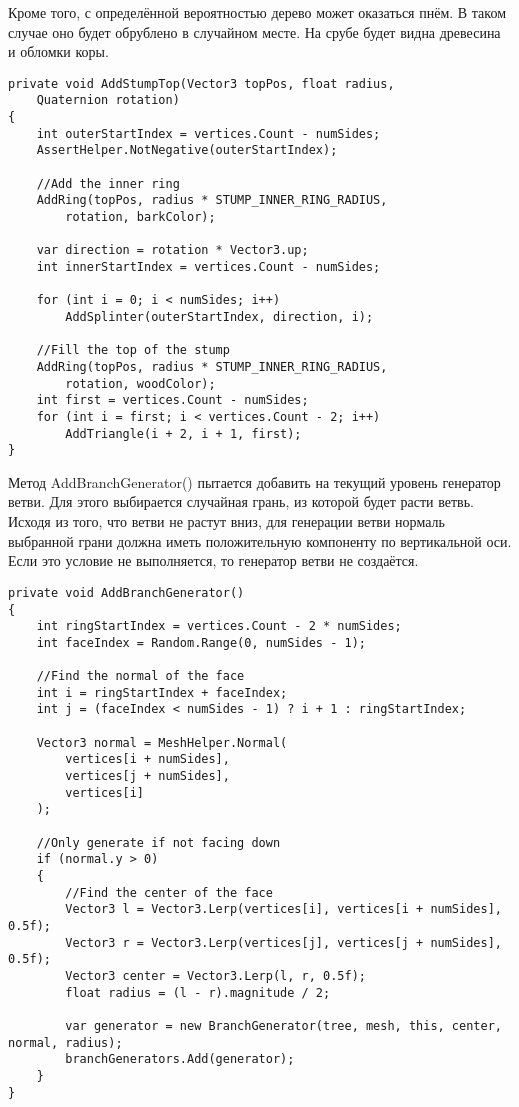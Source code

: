 Кроме того, с определённой вероятностью дерево может оказаться пнём. В таком случае оно будет обрублено в случайном месте. На срубе будет видна древесина и обломки коры.
\begin{lstlisting}
private void AddStumpTop(Vector3 topPos, float radius, 
    Quaternion rotation)
{
    int outerStartIndex = vertices.Count - numSides;
    AssertHelper.NotNegative(outerStartIndex);

    //Add the inner ring
    AddRing(topPos, radius * STUMP_INNER_RING_RADIUS, 
        rotation, barkColor);

    var direction = rotation * Vector3.up;
    int innerStartIndex = vertices.Count - numSides;

    for (int i = 0; i < numSides; i++) 
        AddSplinter(outerStartIndex, direction, i);

    //Fill the top of the stump
    AddRing(topPos, radius * STUMP_INNER_RING_RADIUS, 
        rotation, woodColor);
    int first = vertices.Count - numSides;
    for (int i = first; i < vertices.Count - 2; i++) 
        AddTriangle(i + 2, i + 1, first);
}
\end{lstlisting}


Метод AddBranchGenerator() пытается добавить на текущий уровень генератор ветви. Для этого выбирается случайная грань, из которой будет расти ветвь. Исходя из того, что ветви не растут вниз, для генерации ветви нормаль выбранной грани должна иметь положительную компоненту по вертикальной оси. Если это условие не выполняется, то генератор ветви не создаётся.
\begin{lstlisting}
private void AddBranchGenerator()
{
    int ringStartIndex = vertices.Count - 2 * numSides;
    int faceIndex = Random.Range(0, numSides - 1);

    //Find the normal of the face
    int i = ringStartIndex + faceIndex;
    int j = (faceIndex < numSides - 1) ? i + 1 : ringStartIndex;

    Vector3 normal = MeshHelper.Normal(
        vertices[i + numSides],
        vertices[j + numSides],
        vertices[i]
    );

    //Only generate if not facing down
    if (normal.y > 0)
    {
        //Find the center of the face
        Vector3 l = Vector3.Lerp(vertices[i], vertices[i + numSides], 0.5f);
        Vector3 r = Vector3.Lerp(vertices[j], vertices[j + numSides], 0.5f);
        Vector3 center = Vector3.Lerp(l, r, 0.5f);
        float radius = (l - r).magnitude / 2;

        var generator = new BranchGenerator(tree, mesh, this, center, normal, radius);
        branchGenerators.Add(generator);
    }
}
\end{lstlisting}

